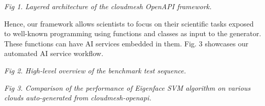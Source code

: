 \documentclass[letter,10pt]{article}
\begin{document}
\begin{multicols}{3}
{\em Fig 1. Layered architecture of the cloudmesh Open\-API framework.}

\bigskip
Hence, our framework allows scientists to focus on their scientific tasks exposed to well-known programming using functions and classes as input to the generator. These functions can have AI services embedded in them. Fig. 3 showcases our automated AI service workflow. 



\begin{center}
\end{center}

{\em Fig 2. High-level overview of the benchmark test sequence.}


\begin{center}
\end{center}

{\em Fig 3. Comparison of the performance of Eigenface SVM algorithm on various clouds auto-generated from cloudmesh-openapi.}


\end{multicols}
\end{document}
